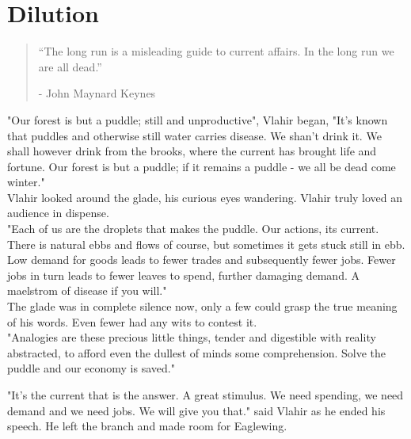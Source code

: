 \documentclass[smalldemyvopaper,11pt,twoside,onecolumn,openright,extrafontsizes]{memoir}
\newlength\drop
\begin{document}
\chapter{Dilution}

\vspace{-1.3cm}
\begin{localsize}{10}
	\begin{quote}
		“The long run is a misleading guide to current affairs. In the long run we are all dead.” 
		\begin{flushright}- John Maynard Keynes \end{flushright}
	\end{quote} 
\end{localsize}
\vspace{1cm}

"Our forest is but a puddle; still and unproductive", Vlahir began, "It's known that puddles and otherwise still water carries disease. We shan't drink it.
We shall however drink from the brooks, where the current has brought life and fortune. Our forest is but a puddle; if it remains a puddle - we all be dead come winter."\\

Vlahir looked around the glade, his curious eyes wandering. Vlahir truly loved an audience in dispense.\\

"Each of us are the droplets that makes the puddle. Our actions, its current. There is natural ebbs and flows of course, but sometimes it gets stuck still in ebb. Low demand for goods leads to fewer trades and subsequently fewer jobs. Fewer jobs in turn leads to fewer leaves to spend, further damaging demand. A maelstrom of disease if you will."\\

The glade was in complete silence now, only a few could grasp the true meaning of his words. Even fewer had any wits to contest it. \\

"Analogies are these precious little things, tender and digestible with reality abstracted, to afford even the dullest of minds some comprehension. Solve the puddle and our economy is saved."

"It's the current that is the answer. A great stimulus. We need spending, we need demand and we need jobs. We will give you that." said Vlahir as he ended his speech. He left the branch and made room for Eaglewing.\\
\end{document}
